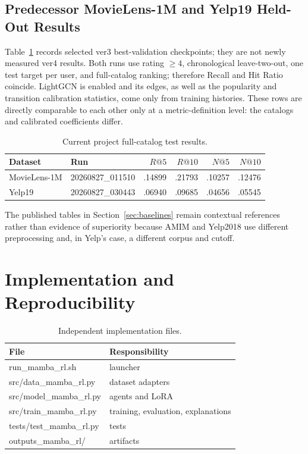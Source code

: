\documentclass[11pt,a4paper]{article}
\begin{document}
\subsection{Predecessor MovieLens-1M and Yelp19 Held-Out Results}

Table~\ref{tab:ml-yelp-project} records selected ver3 best-validation
checkpoints; they are not newly measured ver4 results. Both runs use rating $\geq4$,
chronological leave-two-out, one test target per user, and full-catalog ranking;
therefore Recall and Hit Ratio coincide. LightGCN is enabled and its edges, as
well as the popularity and transition calibration statistics, come only from
training histories. These rows are directly comparable to each other only at a
metric-definition level: the catalogs and calibrated coefficients differ.

\begin{table}[H]
\centering
\caption{Current project full-catalog test results.}
\label{tab:ml-yelp-project}
\begin{tabular}{@{}llrrrr@{}}
\toprule
Dataset & Run & $R@5$ & $R@10$ & $N@5$ & $N@10$ \\
\midrule
MovieLens-1M & 20260827\_011510 & .14899 & .21793 & .10257 & .12476 \\
Yelp19 & 20260827\_030443 & .06940 & .09685 & .04656 & .05545 \\
\bottomrule
\end{tabular}
\end{table}

The published tables in Section~\ref{sec:baselines} remain contextual
references rather than evidence of superiority because AMIM and Yelp2018 use
different preprocessing and, in Yelp's case, a different corpus and cutoff.

\section{Implementation and Reproducibility}

\begin{table}[H]
\centering
\caption{Independent implementation files.}
\begin{tabularx}{\textwidth}{>{\ttfamily}p{}X}
\toprule
File & Responsibility\\
\midrule
run\_mamba\_rl.sh & launcher\\
src/data\_mamba\_rl.py & dataset adapters\\
src/model\_mamba\_rl.py & agents and LoRA\\
src/train\_mamba\_rl.py & training, evaluation, explanations\\
tests/test\_mamba\_rl.py & tests\\
outputs\_mamba\_rl/ & artifacts\\
\bottomrule
\end{tabularx}
\end{table}
\end{document}
